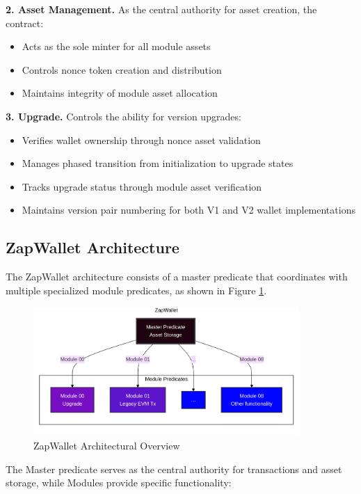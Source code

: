 \textbf{2. Asset Management.} As the central authority for asset creation, the contract:
\begin{itemize}
    \item Acts as the sole minter for all module assets
    \item Controls nonce token creation and distribution
    \item Maintains integrity of module asset allocation
\end{itemize}

\textbf{3. Upgrade.} Controls the ability for version upgrades:
\begin{itemize}
    \item Verifies wallet ownership through nonce asset validation
    \item Manages phased transition from initialization to upgrade states
    \item Tracks upgrade status through module asset verification
    \item Maintains version pair numbering for both V1 and V2 wallet implementations
\end{itemize}


\subsection{ZapWallet Architecture}

The ZapWallet architecture consists of a master predicate that coordinates with multiple specialized module predicates,
as shown in Figure \ref{fig:zapwallet-structure}. \\

\begin{figure}[H]
    \centering
    \includegraphics[width=0.9\textwidth]{images/architecture-structure2.png}
    \caption{ZapWallet Architectural Overview}
    \label{fig:zapwallet-structure}
\end{figure}

The Master predicate serves as the central authority for transactions and asset storage, while Modules provide specific functionality:

